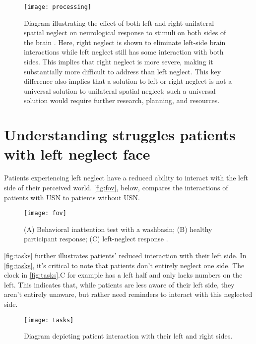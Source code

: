\begin{figure}[h]
  \centering
  \texttt{[image: processing]}
  \caption[Environment processing in the brain.]{Diagram illustrating the
    effect of both left and right unilateral spatial neglect on neurological
    response to stimuli on both sides of the brain
    \cite{noauthor_half_2016}. Here, right neglect is 
    shown to eliminate left-side brain interactions while left neglect still
    has some interaction with both sides. This implies that right neglect is
    more severe, making it substantially more difficult to address than left
    neglect. This key difference also implies that a solution to left or right
    neglect is not a universal solution to unilateral spatial neglect; such a
    universal solution would require further research, planning, and
    resources.}
  \label{fig:processing}
\end{figure}

\section{Understanding struggles patients with left neglect face}

Patients experiencing left neglect have a reduced ability to interact with the
left side of their perceived world. \autoref{fig:fov}, below, compares the
interactions of patients with USN to patients without USN. 

\begin{figure}[h]
  \centering
  \texttt{[image: fov]}
  \caption[Left neglect field of view comparison.]{(A) Behavioral inattention
    test with a washbasin; (B) healthy participant response; (C) left-neglect
    response \cite{gammeri_unilateral_2020}.}
  \label{fig:fov}
\end{figure}

\autoref{fig:tasks} further illustrates patients’ reduced interaction with
their left side. In \autoref{fig:tasks}, it’s critical to note that patients
don’t entirely neglect one side. The clock in \autoref{fig:tasks}.C for example
has a left half and only lacks numbers on the left. This indicates that, while
patients are less aware of their left side, they aren’t entirely unaware, but
rather need reminders to interact with this neglected side.

\begin{figure}[h]
  \centering
  \texttt{[image: tasks]}
  \caption[Left neglect tasks]{Diagram depicting patient interaction with their
    left and right sides. \cite{ting_visual_2011}}
  \label{fig:tasks}
\end{figure}

